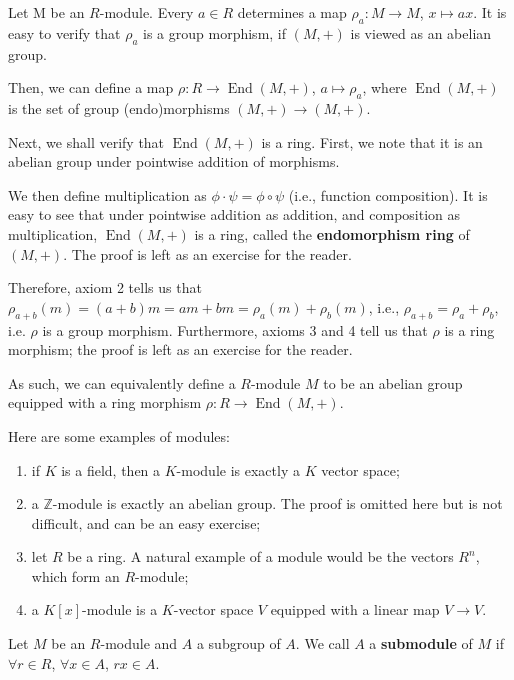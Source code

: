 \documentclass[12pt, a4paper, titlepage]{report}
\DeclareMathOperator{\Endo}{End}
\begin{document}
\begin{rem}
  Let M be an $R$-module. Every $a \in R$ determines a map $\rho_a : M \rightarrow M$, $x \mapsto ax$. It is easy to verify that
  $\rho_a$ is a group morphism, if $(M, +)$ is viewed as an abelian group.

  Then, we can define a map $\rho : R \rightarrow \Endo(M, +)$, $a \mapsto \rho_a$, where $\Endo(M, +)$ is the set of
  group (endo)morphisms $(M, +) \rightarrow (M, +)$.

  Next, we shall verify that $\Endo(M, +)$ is a ring. First, we note that it is an abelian group under pointwise addition of
  morphisms.

  We then define multiplication as $\phi \cdot \psi = \phi \circ \psi$ (i.e., function composition). It is easy to see that under
  pointwise addition as addition, and composition as multiplication, $\Endo(M, +)$ is a ring, called the \textbf{endomorphism ring}
  of $(M, +)$. The proof is left as an exercise for the reader.

  Therefore, axiom 2 tells us that $\rho_{a + b}(m) = (a+b)m = am + bm = \rho_a(m) + \rho_b(m)$, i.e., $\rho_{a + b} = \rho_a + \rho_b$, i.e.
  $\rho$ is a group morphism. Furthermore, axioms 3 and 4 tell us that $\rho$ is a ring morphism; the proof is left as an exercise
  for the reader.

  As such, we can equivalently define a $R$-module $M$ to be an abelian group equipped with a ring morphism
  $\rho : R \rightarrow \Endo(M, +)$.
\end{rem}

\begin{exmp}
  Here are some examples of modules:
  \begin{enumerate}
  \item if $K$ is a field, then a $K$-module is exactly a $K$ vector space;
  \item a $\mathbb{Z}$-module is exactly an abelian group. The proof is omitted here but is not difficult, and
    can be an easy exercise;
  \item let $R$ be a ring. A natural example of a module would be the vectors $R^n$, which form an $R$-module;
  \item a $K[x]$-module is a $K$-vector space $V$ equipped with a linear map $V \rightarrow V$.
  \end{enumerate}
\end{exmp}

\begin{defn}
  Let $M$ be an $R$-module and $A$ a subgroup of $A$. We call $A$ a \textbf{submodule} of $M$ if
  $\forall r \in R$, $\forall x \in A$, $rx \in A$.
\end{defn}
\end{document}

